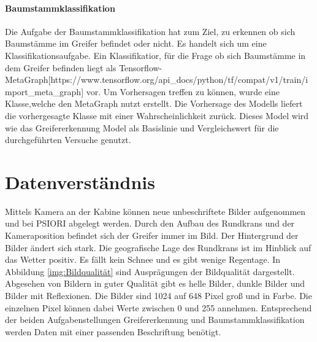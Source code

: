 	\paragraph{Baumstammklassifikation} Die Aufgabe der Baumstammklassifikation hat zum Ziel, zu erkennen ob sich Baumstämme im Greifer befindet oder nicht. Es handelt sich um eine Klassifikationsaufgabe.
	Ein Klassifikatior, für die Frage ob sich Baumstämme in dem Greifer befinden liegt als Tensorflow-MetaGraph[https://www.tensorflow.org/api\_docs/python/tf/compat/v1/train/import\_meta\_graph] vor. Um Vorhersagen treffen zu können, wurde eine Klasse,welche den MetaGraph nutzt erstellt. Die Vorhersage des Modells liefert die vorhergesagte Klasse mit einer Wahrscheinlichkeit zurück. Dieses Model wird wie das Greifererkennung Model als Basislinie und Vergleichswert für die durchgeführten Versuche genutzt.

	\section{Datenverständnis}
	\label{sec:DataUnderstanding}
	Mittels Kamera an der Kabine können neue unbeschriftete Bilder aufgenommen und bei PSIORI abgelegt werden. Durch den Aufbau des Rundkrans und der Kameraposition befindet sich der Greifer immer im Bild. Der Hintergrund der Bilder ändert sich stark. Die geografische Lage des Rundkrans ist im Hinblick auf das Wetter positiv. Es fällt kein Schnee und es gibt wenige Regentage. In Abbildung  \ref{img:Bildqualität} sind Ausprägungen der Bildqualität dargestellt. Abgesehen von Bildern in guter Qualität gibt es helle Bilder, dunkle Bilder und Bilder mit Reflexionen. Die Bilder sind 1024 auf 648 Pixel groß und in Farbe. Die einzelnen Pixel können dabei Werte zwischen 0 und 255 annehmen. 
	Entsprechend der beiden Aufgabenstellungen Greifererkennung und Baumstammklassifikation werden Daten mit einer passenden Beschriftung benötigt.
	
